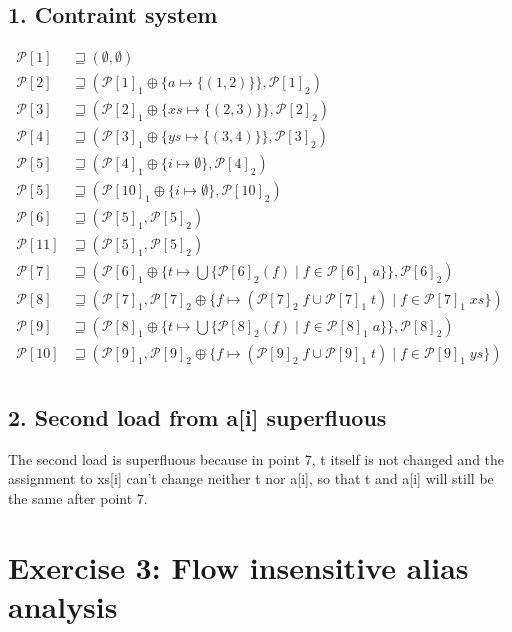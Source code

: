 \documentclass[11pt,a4paper]{scrartcl}
\begin{document}
\subsection*{1. Contraint system}
\begin{align*}
\mathcal{P}[1] &\sqsupseteq (\emptyset, \emptyset)\\
\mathcal{P}[2] &\sqsupseteq (\mathcal{P}[1]_1 \oplus \{a \mapsto \{(1,2)\}\}, \mathcal{P}[1]_2)\\
\mathcal{P}[3] &\sqsupseteq (\mathcal{P}[2]_1 \oplus \{xs \mapsto \{(2,3)\}\}, \mathcal{P}[2]_2)\\
\mathcal{P}[4] &\sqsupseteq (\mathcal{P}[3]_1 \oplus \{ys \mapsto \{(3,4)\}\}, \mathcal{P}[3]_2)\\
\mathcal{P}[5] &\sqsupseteq (\mathcal{P}[4]_1 \oplus \{i \mapsto \emptyset\}, \mathcal{P}[4]_2)\\
\mathcal{P}[5] &\sqsupseteq (\mathcal{P}[10]_1 \oplus \{i \mapsto \emptyset\}, \mathcal{P}[10]_2)\\
\mathcal{P}[6] &\sqsupseteq (\mathcal{P}[5]_1, \mathcal{P}[5]_2)\\
\mathcal{P}[11] &\sqsupseteq (\mathcal{P}[5]_1, \mathcal{P}[5]_2)\\
\mathcal{P}[7] &\sqsupseteq (\mathcal{P}[6]_1 \oplus \{t \mapsto \bigcup \{\mathcal{P}[6]_2(f)\;|\;f \in \mathcal{P}[6]_1\;a\}\}, \mathcal{P}[6]_2)\\
\mathcal{P}[8] &\sqsupseteq (\mathcal{P}[7]_1, \mathcal{P}[7]_2 \oplus \{f \mapsto (\mathcal{P}[7]_2\;f \cup \mathcal{P}[7]_1\;t)\;|\;f \in \mathcal{P}[7]_1\;xs\})\\
\mathcal{P}[9] &\sqsupseteq (\mathcal{P}[8]_1 \oplus \{t \mapsto \bigcup \{\mathcal{P}[8]_2(f)\;|\;f \in \mathcal{P}[8]_1\;a\}\}, \mathcal{P}[8]_2)\\
\mathcal{P}[10] &\sqsupseteq (\mathcal{P}[9]_1, \mathcal{P}[9]_2 \oplus \{f \mapsto (\mathcal{P}[9]_2\;f \cup \mathcal{P}[9]_1\;t)\;|\;f \in \mathcal{P}[9]_1\;ys\})\\
\end{align*}

\subsection*{2. Second load from a[i] superfluous}
The second load is superfluous because in point 7, t itself is not changed and the assignment to xs[i] can't change neither t nor a[i], so that t and a[i] will still be the same after point 7.


\section*{Exercise 3: Flow insensitive alias analysis}
\end{document}
